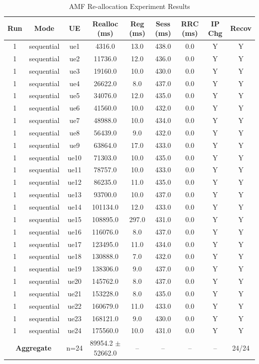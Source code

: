 \begin{table}[ht]
\centering
\begin{tabular}{|c|c|c|c|c|c|c|c|c|}
\hline
Run & Mode & UE & Realloc (ms) & Reg (ms) & Sess (ms) & RRC (ms) & IP Chg & Recov \\
\hline
1 & sequential & ue1 & 4316.0 & 13.0 & 438.0 & 0.0 & Y & Y \\
1 & sequential & ue2 & 11736.0 & 12.0 & 436.0 & 0.0 & Y & Y \\
1 & sequential & ue3 & 19160.0 & 10.0 & 430.0 & 0.0 & Y & Y \\
1 & sequential & ue4 & 26622.0 & 8.0 & 437.0 & 0.0 & Y & Y \\
1 & sequential & ue5 & 34076.0 & 12.0 & 435.0 & 0.0 & Y & Y \\
1 & sequential & ue6 & 41560.0 & 10.0 & 432.0 & 0.0 & Y & Y \\
1 & sequential & ue7 & 48988.0 & 10.0 & 434.0 & 0.0 & Y & Y \\
1 & sequential & ue8 & 56439.0 & 9.0 & 432.0 & 0.0 & Y & Y \\
1 & sequential & ue9 & 63864.0 & 17.0 & 433.0 & 0.0 & Y & Y \\
1 & sequential & ue10 & 71303.0 & 10.0 & 435.0 & 0.0 & Y & Y \\
1 & sequential & ue11 & 78757.0 & 10.0 & 433.0 & 0.0 & Y & Y \\
1 & sequential & ue12 & 86235.0 & 11.0 & 435.0 & 0.0 & Y & Y \\
1 & sequential & ue13 & 93700.0 & 10.0 & 437.0 & 0.0 & Y & Y \\
1 & sequential & ue14 & 101134.0 & 12.0 & 433.0 & 0.0 & Y & Y \\
1 & sequential & ue15 & 108895.0 & 297.0 & 431.0 & 0.0 & Y & Y \\
1 & sequential & ue16 & 116076.0 & 8.0 & 437.0 & 0.0 & Y & Y \\
1 & sequential & ue17 & 123495.0 & 11.0 & 434.0 & 0.0 & Y & Y \\
1 & sequential & ue18 & 130888.0 & 7.0 & 432.0 & 0.0 & Y & Y \\
1 & sequential & ue19 & 138306.0 & 9.0 & 437.0 & 0.0 & Y & Y \\
1 & sequential & ue20 & 145762.0 & 8.0 & 437.0 & 0.0 & Y & Y \\
1 & sequential & ue21 & 153228.0 & 8.0 & 435.0 & 0.0 & Y & Y \\
1 & sequential & ue22 & 160679.0 & 11.0 & 433.0 & 0.0 & Y & Y \\
1 & sequential & ue23 & 168121.0 & 9.0 & 430.0 & 0.0 & Y & Y \\
1 & sequential & ue24 & 175560.0 & 10.0 & 431.0 & 0.0 & Y & Y \\
\multicolumn{2}{|c|}{\textbf{Aggregate}} & n=24 & 89954.2 $\pm$ 52662.0 & -- & -- & -- & -- & 24/24 \\
\hline
\end{tabular}
\caption{AMF Re-allocation Experiment Results}
\label{tab:amf_realloc}
\end{table}
